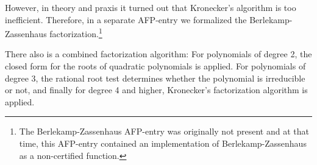 \documentclass[11pt,a4paper]{article}
\begin{document}
However, in theory and praxis it turned out that Kronecker's algorithm is too inefficient. 
Therefore, in a separate AFP-entry we formalized the Berlekamp-Zassenhaus 
factorization.\footnote{The Berlekamp-Zassenhaus AFP-entry was originally not present 
and at that time,
this AFP-entry contained an implementation of Berlekamp-Zassenhaus as a
non-certified function.}


There also is a combined factorization algorithm: For polynomials of degree 2, the 
closed form for the roots of quadratic polynomials is applied. For polynomials of degree 3, 
the rational root test determines whether the polynomial is irreducible or not, and finally
for degree 4 and higher, Kronecker's factorization algorithm is applied.







\end{document}
